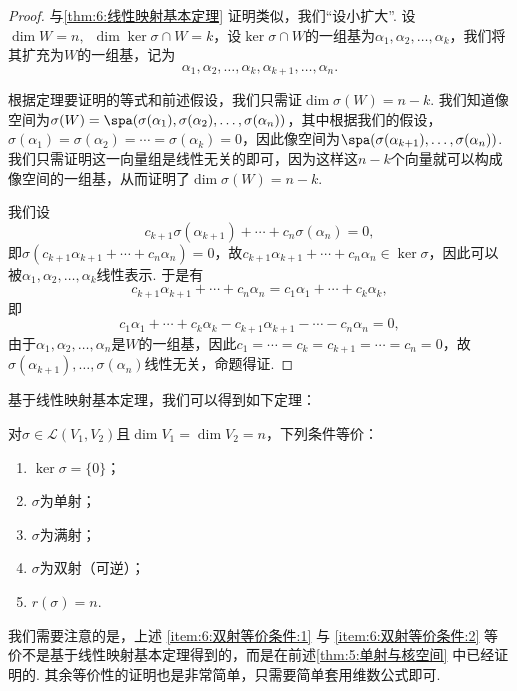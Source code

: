 \begin{proof}
    与\autoref{thm:6:线性映射基本定理} 证明类似，我们``设小扩大''. 设$\dim W=n,\enspace\dim\ker\sigma\cap W=k$，设$\ker\sigma\cap W$的一组基为$\alpha_1,\alpha_2,\ldots,\alpha_k$，我们将其扩充为$W$的一组基，记为
    \[\alpha_1,\alpha_2,\ldots,\alpha_k,\alpha_{k+1},\ldots,\alpha_n.\]

    根据定理要证明的等式和前述假设，我们只需证$\dim\sigma(W)=n-k$. 我们知道像空间为$\sigma(W)=\spa(\sigma(\alpha_1),\sigma(\alpha_2),\ldots,\sigma(\alpha_n))$，其中根据我们的假设，$\sigma(\alpha_1)=\sigma(\alpha_2)=\cdots=\sigma(\alpha_k)=0$，因此像空间为$\spa(\sigma(\alpha_{k+1}),\ldots,\sigma(\alpha_n))$. 我们只需证明这一向量组是线性无关的即可，因为这样这$n-k$个向量就可以构成像空间的一组基，从而证明了$\dim\sigma(W)=n-k$.

    我们设
    \[c_{k+1}\sigma(\alpha_{k+1})+\cdots+c_n\sigma(\alpha_n)=0,\]
    即$\sigma(c_{k+1}\alpha_{k+1}+\cdots+c_n\alpha_n)=0$，故$c_{k+1}\alpha_{k+1}+\cdots+c_n\alpha_n\in\ker\sigma$，因此可以被$\alpha_1,\alpha_2,\ldots,\alpha_k$线性表示. 于是有
    \[c_{k+1}\alpha_{k+1}+\cdots+c_n\alpha_n=c_1\alpha_1+\cdots+c_k\alpha_k,\]
    即
    \[c_1\alpha_1+\cdots+c_k\alpha_k-c_{k+1}\alpha_{k+1}-\cdots-c_n\alpha_n=0,\]
    由于$\alpha_1,\alpha_2,\ldots,\alpha_n$是$W$的一组基，因此$c_1=\cdots=c_k=c_{k+1}=\cdots=c_n=0$，故$\sigma(\alpha_{k+1}),\ldots,\sigma(\alpha_n)$线性无关，命题得证.
\end{proof}

基于线性映射基本定理，我们可以得到如下定理：
\begin{theorem}\label{thm:6:双射等价条件}
    对$\sigma \in \mathcal{L}(V_1,V_2)$且$\dim V_1=\dim V_2=n$，下列条件等价：
    \begin{enumerate}
        \item \label{item:6:双射等价条件:1}
              $\ker \sigma=\{0\}$；

        \item \label{item:6:双射等价条件:2}
              $\sigma$为单射；

        \item $\sigma$为满射；

        \item $\sigma$为双射（可逆）；

        \item $r(\sigma)=n$.
    \end{enumerate}
\end{theorem}

我们需要注意的是，上述 \ref*{item:6:双射等价条件:1} 与 \ref*{item:6:双射等价条件:2} 等价不是基于线性映射基本定理得到的，而是在前述\autoref{thm:5:单射与核空间} 中已经证明的. 其余等价性的证明也是非常简单，只需要简单套用维数公式即可.

